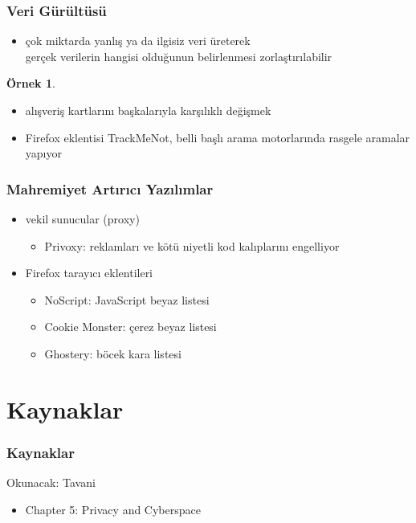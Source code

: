 \documentclass[dvipsnames]{beamer}
\theoremstyle{definition}
\theoremstyle{example}
\newtheorem{ornek}[theorem]{Örnek}
\theoremstyle{plain}
\begin{document}
\begin{frame}
  \frametitle{Veri Gürültüsü}

  \begin{itemize}
    \item çok miktarda yanlış ya da ilgisiz veri üreterek\\
      gerçek verilerin hangisi olduğunun belirlenmesi zorlaştırılabilir
  \end{itemize}

  \pause
  \begin{ornek}
    \begin{itemize}
      \item alışveriş kartlarını başkalarıyla karşılıklı değişmek
      \item Firefox eklentisi TrackMeNot, belli başlı arama motorlarında
        rasgele aramalar yapıyor
    \end{itemize}
  \end{ornek}
\end{frame}

\begin{frame}
  \frametitle{Mahremiyet Artırıcı Yazılımlar}

  \begin{itemize}
    \item vekil sunucular (proxy)
    \begin{itemize}
      \item Privoxy: reklamları ve kötü niyetli kod kalıplarını engelliyor
    \end{itemize}

    \pause
    \medskip
    \item Firefox tarayıcı eklentileri
    \begin{itemize}
      \item NoScript: JavaScript beyaz listesi
      \item Cookie Monster: çerez beyaz listesi
      \item Ghostery: böcek kara listesi
    \end{itemize}
  \end{itemize}
\end{frame}

\section*{Kaynaklar}

\begin{frame}
  \frametitle{Kaynaklar}

  \begin{block}{Okunacak: Tavani}
    \begin{itemize}
      \item Chapter 5: \alert{Privacy and Cyberspace}
    \end{itemize}
  \end{block}
\end{frame}
\end{document}
